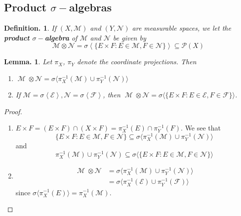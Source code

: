 \documentclass[11pt, a4paper]{memoir}
\newcommand{\brac}[1]{\ensuremath{\left\langle #1 \right\rangle}}
\theoremstyle{change}
\newtheorem{lemma}[theorem]{Lemma.}
\theoremstyle{plain}
\theoremstyle{nonumberplain}
\newtheorem{definition}{Definition.}
\newtheorem{proof}{Proof}
\DeclareMathOperator{\M}{{\mathcal{M}}}
\numberwithin{equation}{section}
\begin{document}
\subsection{Product \texorpdfstring{$\sigma-$}{s-}algebras}
\begin{definition}
    If $(X,\mathcal{M})$ and $(Y,\mathcal{N})$ are measurable spaces, we let the \textbf{product $\sigma-$algebra} of $\mathcal{M}$ and $\mathcal{N}$ be given by
    \begin{equation*}
        \mathcal{M}\otimes\mathcal{N}=\sigma\brac{\{E\times F:E\in\mathcal{M},F\in\mathcal{N}\}}\subseteq\mathcal{P}(X)
    \end{equation*}
\end{definition}
\begin{lemma}
    Let $\pi_X$, $\pi_Y$ denote the coordinate projections.
    Then
    \begin{enumerate}
        \item $\M\otimes\mathcal{N}=\sigma\langle\pi_X^{-1}(\mathcal{M})\cup\pi_Y^{-1}(\mathcal{N})\rangle$
        \item If $\mathcal{M}=\sigma\brac{\mathcal{E}},\mathcal{N}=\sigma\brac{\mathcal{F}}$, then $\M\otimes\mathcal{N}=\sigma\langle\{E\times F:E\in\mathcal{E},F\in\mathcal{F}\}\rangle$.
    \end{enumerate}
\end{lemma}
\begin{proof}
    \begin{enumerate}
        \item $E\times F=(E\times F)\cap(X\times F)=\pi^{-1}_X(E)\cap\pi^{-1}_Y(F)$.
            We see that
            \begin{equation*}
                \{E\times F:E\in\mathcal{M},F\in\mathcal{N}\}\subseteq\sigma\langle\pi_X^{-1}(\mathcal{M})\cup\pi_Y^{-1}(\mathcal{N})\rangle
            \end{equation*}
            and
            \begin{equation*}
                \pi_X^{-1}(\mathcal{M})\cup\pi_Y^{-1}(\mathcal{N})\subseteq\sigma\langle\{E\times F:E\in\mathcal{M},F\in\mathcal{N}\}\rangle
            \end{equation*}
        \item
            \begin{align*}
                \M\otimes\mathcal{N} &= \sigma\langle\pi_X^{-1}(\mathcal{M})\cup\pi_Y^{-1}(\mathcal{N})\rangle\\
                                     &= \sigma\langle\pi_X^{-1}(\mathcal{E})\cup\pi_Y^{-1}(\mathcal{F})\rangle
            \end{align*}
            since $\sigma\langle\pi_X^{-1}(E)\rangle=\pi_X^{-1}(\mathcal{M})$.
    \end{enumerate}
\end{proof}
\end{document}
